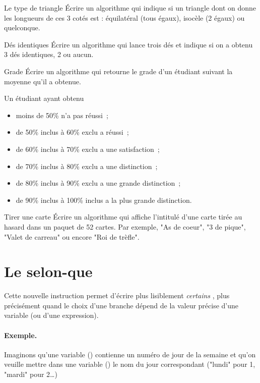 	\begin{Exercice}{Le type de triangle}
		Écrire un algorithme qui indique si un triangle
		dont on donne les longueurs de ces 3 cotés est :
		équilatéral (tous égaux), isocèle (2 égaux)
		ou quelconque.
	\end{Exercice}

	\begin{Exercice}{Dés identiques}
		Écrire un algorithme qui lance trois dés
		et indique si on a obtenu 3 dés identiques,
		2 ou aucun.
	\end{Exercice}

	\begin{Exercice}{Grade}
		Écrire un algorithme qui retourne le grade d'un étudiant 
		suivant la moyenne qu'il a obtenue.
		
		Un étudiant ayant obtenu 
		\begin{itemize}
			\item moins de 50\% n'a pas réussi~;
			\item de 50\% inclus à 60\% exclu a réussi~;
			\item de 60\% inclus à 70\% exclu a une satisfaction~;
			\item de 70\% inclus à 80\% exclu a une distinction~;
			\item de 80\% inclus à 90\% exclu a une grande distinction~;
			\item de 90\% inclus à 100\% inclus a la plus grande distinction.
		\end{itemize}
	\end{Exercice}

	\begin{Exercice}{Tirer une carte}
		Écrire un algorithme qui affiche l'intitulé d'une carte
		tirée au hasard dans un paquet de 52 cartes.
		Par exemple, "As de coeur", "3 de pique", "Valet de carreau"
		ou encore "Roi de trèfle".
	\end{Exercice}

\clearpage
\section{Le selon-que}

	Cette nouvelle instruction permet d'écrire plus lisiblement
	\emph{certains} ,
	plus précisément quand le choix d'une branche dépend
	de la valeur précise d'une variable
	(ou d'une expression).

	\paragraph{Exemple.}
	Imaginons qu'une variable () 
	contienne un numéro de jour de la semaine
	et qu'on veuille mettre dans une variable ()
	le nom du jour correspondant 
	("lundi" pour 1, "mardi" pour 2\dots)
	
